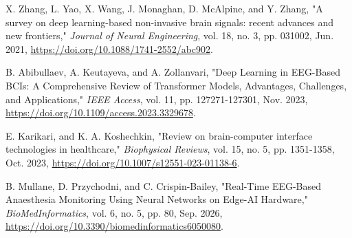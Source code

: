  X. Zhang, L. Yao, X. Wang, J. Monaghan, D. McAlpine, and Y. Zhang, "A survey on deep learning-based non-invasive brain signals: recent advances and new frontiers," \textit{Journal of Neural Engineering}, vol. 18, no. 3, pp. 031002, Jun. 2021, \url{https://doi.org/10.1088/1741-2552/abc902}.

 B. Abibullaev, A. Keutayeva, and A. Zollanvari, "Deep Learning in EEG-Based BCIs: A Comprehensive Review of Transformer Models, Advantages, Challenges, and Applications," \textit{IEEE Access}, vol. 11, pp. 127271-127301, Nov. 2023, \url{https://doi.org/10.1109/access.2023.3329678}.

 E. Karikari, and K. A. Koshechkin, "Review on brain-computer interface technologies in healthcare," \textit{Biophysical Reviews}, vol. 15, no. 5, pp. 1351-1358, Oct. 2023, \url{https://doi.org/10.1007/s12551-023-01138-6}.

 B. Mullane, D. Przychodni, and C. Crispin-Bailey, "Real-Time EEG-Based Anaesthesia Monitoring Using Neural Networks on Edge-AI Hardware," \textit{BioMedInformatics}, vol. 6, no. 5, pp. 80, Sep. 2026, \url{https://doi.org/10.3390/biomedinformatics6050080}.
